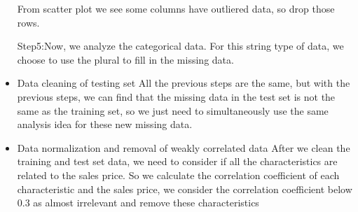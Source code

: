 \documentclass{amsart}
\begin{document}
\begin{itemize}
	From scatter plot we see some columns have outliered data, so drop those rows.\par
	Step5:Now, we analyze the categorical data. For this string type of data, we choose to use the plural to fill in the missing data.\par
	\item Data cleaning of testing set
	All the previous steps are the same, but with the previous steps, we can find that the missing data in the test set is not the same as the training set, so we just need to simultaneously use the same analysis idea for these new missing data.\par
	\item Data normalization and removal of weakly correlated data
	After we clean the training and test set data, we need to consider if all the characteristics are related to the sales price. So we calculate the correlation coefficient of each characteristic and the sales price, we consider the correlation coefficient below 0.3 as almost irrelevant and remove these characteristics
	\end{itemize}
\end{document}
